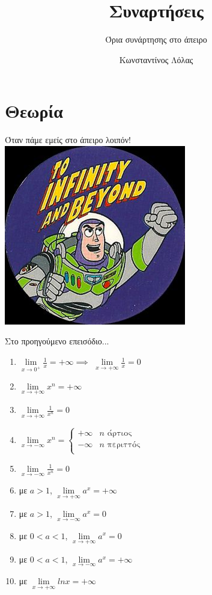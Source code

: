 \documentclass[greek]{beamer}
\title{Συναρτήσεις}
\subtitle{Όρια συνάρτησης στο άπειρο}
\author[Λόλας]{Κωνσταντίνος Λόλας}
\institute[$10^ο$ ΓΕΛ]{$10^ο$ ΓΕΛ Θεσσαλονίκης}
\date{}
\begin{document}
\begin{frame}
      \titlepage
\end{frame}

\section{Θεωρία}
\begin{frame}{Όταν πάμε εμείς στο άπειρο λοιπόν!}
      \centering
      \includegraphics[height=0.6\columnwidth]{images/buzz}
\end{frame}

\begin{frame}{Στο προηγούμενο επεισόδιο...}
      \begin{enumerate}
            \item $\lim\limits_{x \to 0^+}{ \frac{1}{x} } = +\infty\implies$ \pause $\lim\limits_{x \to +\infty}{ \frac{1}{x} }=0$ \pause
            \item $\lim\limits_{x \to +\infty}{ x^n } = +\infty$ \pause
            \item $\lim\limits_{x \to +\infty}{ \frac{1}{x^n} } = 0$ \pause
            \item $\lim\limits_{x \to -\infty}{ x^n } = \begin{cases}
                              +\infty & n \text{ άρτιος}   \\
                              -\infty & n \text{ περιττός} \\
                        \end{cases}$ \pause
            \item $\lim\limits_{x \to -\infty}{ \frac{1}{x^n} } = 0$ \pause
            \item με $a>1$, $\lim\limits_{x \to +\infty}{ a^x } = +\infty$ \pause
            \item με $a>1$, $\lim\limits_{x \to -\infty}{ a^x } = 0$ \pause
            \item με $0<a<1$, $\lim\limits_{x \to +\infty}{ a^x } = 0$ \pause
            \item με $0<a<1$, $\lim\limits_{x \to -\infty}{ a^x } = +\infty$ \pause
            \item με $\lim\limits_{x \to +\infty}{ lnx } = +\infty$
      \end{enumerate}
\end{frame}
\end{document}
